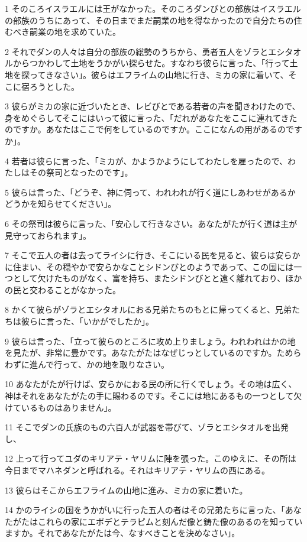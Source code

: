 \par 1 そのころイスラエルには王がなかった。そのころダンびとの部族はイスラエルの部族のうちにあって、その日までまだ嗣業の地を得なかったので自分たちの住むべき嗣業の地を求めていた。
\par 2 それでダンの人々は自分の部族の総勢のうちから、勇者五人をゾラとエシタオルからつかわして土地をうかがい探らせた。すなわち彼らに言った、「行って土地を探ってきなさい」。彼らはエフライムの山地に行き、ミカの家に着いて、そこに宿ろうとした。
\par 3 彼らがミカの家に近づいたとき、レビびとである若者の声を聞きわけたので、身をめぐらしてそこにはいって彼に言った、「だれがあなたをここに連れてきたのですか。あなたはここで何をしているのですか。ここになんの用があるのですか」。
\par 4 若者は彼らに言った、「ミカが、かようかようにしてわたしを雇ったので、わたしはその祭司となったのです」。
\par 5 彼らは言った、「どうぞ、神に伺って、われわれが行く道にしあわせがあるかどうかを知らせてください」。
\par 6 その祭司は彼らに言った、「安心して行きなさい。あなたがたが行く道は主が見守っておられます」。
\par 7 そこで五人の者は去ってライシに行き、そこにいる民を見ると、彼らは安らかに住まい、その穏やかで安らかなことシドンびとのようであって、この国には一つとして欠けたものがなく、富を持ち、またシドンびとと遠く離れており、ほかの民と交わることがなかった。
\par 8 かくて彼らがゾラとエシタオルにおる兄弟たちのもとに帰ってくると、兄弟たちは彼らに言った、「いかがでしたか」。
\par 9 彼らは言った、「立って彼らのところに攻め上りましょう。われわれはかの地を見たが、非常に豊かです。あなたがたはなぜじっとしているのですか。ためらわずに進んで行って、かの地を取りなさい。
\par 10 あなたがたが行けば、安らかにおる民の所に行くでしょう。その地は広く、神はそれをあなたがたの手に賜わるのです。そこには地にあるもの一つとして欠けているものはありません」。
\par 11 そこでダンの氏族のもの六百人が武器を帯びて、ゾラとエシタオルを出発し、
\par 12 上って行ってユダのキリアテ・ヤリムに陣を張った。このゆえに、その所は今日までマハネダンと呼ばれる。それはキリアテ・ヤリムの西にある。
\par 13 彼らはそこからエフライムの山地に進み、ミカの家に着いた。
\par 14 かのライシの国をうかがいに行った五人の者はその兄弟たちに言った、「あなたがたはこれらの家にエポデとテラピムと刻んだ像と鋳た像のあるのを知っていますか。それであなたがたは今、なすべきことを決めなさい」。
